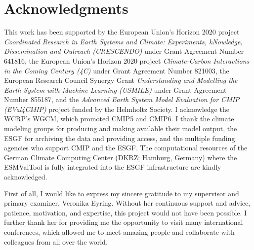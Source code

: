 
%



\chapter{Acknowledgments}

This work has been supported by the European Union's Horizon 2020 project
\emph{Coordinated Research in Earth Systems and Climate: Experiments,
  kNowledge, Dissemination and Outreach (CRESCENDO)} under Grant Agreement
Number 641816, the European Union's Horizon 2020 project \emph{Climate-Carbon
  Interactions in the Coming Century (4C)} under Grant Agreement Number 821003,
the European Research Council Synergy Grant \emph{Understanding and Modelling
  the Earth System with Machine Learning (USMILE)} under Grant Agreement Number
855187, and the \emph{Advanced Earth System Model Evaluation for CMIP
  (EVal4CMIP)} project funded by the Helmholtz Society. I acknowledge the
\ac{WCRP}'s \ac{WGCM}, which promoted \acs{CMIP}5 and \acs{CMIP}6. I thank the
climate modeling groups for producing and making available their model output,
the \ac{ESGF} for archiving the data and providing access, and the multiple
funding agencies who support \ac{CMIP} and the \ac{ESGF}. The computational
resources of the German Climate Computing Center (DKRZ; Hamburg, Germany) where
the \ac{ESMValTool} is fully integrated into the \ac{ESGF} infrastructure are
kindly acknowledged.

First of all, I would like to express my sincere gratitude to my supervisor and
primary examiner, \Prof{} \Dr{} Veronika Eyring. Without her continuous support
and advice, patience, motivation, and expertise, this \PhD{} project would not
have been possible. I further thank her for providing me the opportunity to
visit many international conferences, which allowed me to meet amazing people
and collaborate with colleagues from all over the world.


